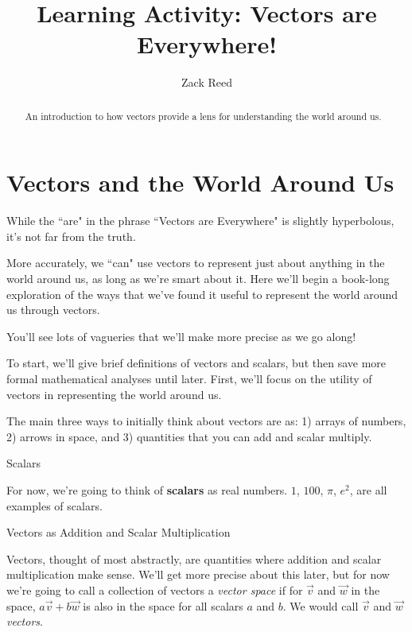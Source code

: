 \documentclass{ximera}
\author{Zack Reed}
\title{Learning Activity: Vectors are Everywhere!}
\begin{document}
\begin{abstract}
    An introduction to how vectors provide a lens for understanding the world around us.
\end{abstract}
\maketitle


\section{Vectors and the World Around Us}

While the ``are" in the phrase ``Vectors are Everywhere" is slightly hyperbolous, it's not far from the truth. 

More accurately, we ``can" use vectors to represent just about anything in the world around us, as long as we're smart about it. Here we'll begin a book-long exploration of the ways that we've found it useful to represent the world around us through vectors. 

You'll see lots of vagueries that we'll make more precise as we go along!

\begin{remark}

  To start, we'll give brief definitions of vectors and scalars, but then save more formal mathematical analyses until later. First, we'll focus on the utility of vectors in representing the world around us.

  The main three ways to initially think about vectors are as: 1) arrays of numbers, 2) arrows in space, and 3) quantities that you can add and scalar multiply.

  \begin{definition}{Scalars}

    For now, we're going to think of \textbf{scalars} as real numbers. $1$, $100$, $\pi$, $e^2$, are all examples of scalars.

  \end{definition}

  \begin{definition}{Vectors as Addition and Scalar Multiplication}

    Vectors, thought of most abstractly, are quantities where addition and scalar multiplication make sense. We'll get more precise about this later, but for now we're going to call a collection of vectors a \textit{vector space} if for $\vec{v}$ and $\vec{w}$ in the space, $a\vec{v}+b\vec{w}$ is also in the space for all scalars $a$ and $b$. We would call $\vec{v}$ and $\vec{w}$ \textit{vectors}.

  \end{definition}

\end{remark}
\end{document}
